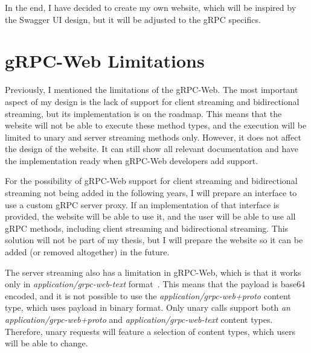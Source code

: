 In the end, I have decided to create my own website, which will be inspired by the Swagger UI design, but it will be adjusted to the gRPC specifics.


\section{gRPC-Web Limitations}
Previously, I mentioned the limitations of the gRPC-Web.
The most important aspect of my design is the lack of support for client streaming and bidirectional streaming, but its implementation is on the roadmap.
This means that the website will not be able to execute these method types, and the execution will be limited to unary and server streaming methods only.
However, it does not affect the design of the website.
It can still show all relevant documentation and have the implementation ready when gRPC-Web developers add support.

For the possibility of gRPC-Web support for client streaming and bidirectional streaming not being added in the following years, I will prepare an interface to use a custom gRPC server proxy.
If an implementation of that interface is provided, the website will be able to use it, and the user will be able to use all gRPC methods, including client streaming and bidirectional streaming.
This solution will not be part of my thesis, but I will prepare the website so it can be added (or removed altogether) in the future.


The server streaming also has a limitation in gRPC-Web, which is that it works only in \textit{application/grpc-web-text} format~\cite{grpc-web}.
This means that the payload is base64 encoded, and it is not possible to use the \textit{application/grpc-web+proto} content type, which uses payload in binary format.
Only unary calls support both \textit{an application/grpc-web+proto} and \textit{application/grpc-web-text} content types.
Therefore, unary requests will feature a selection of content types, which users will be able to change.


